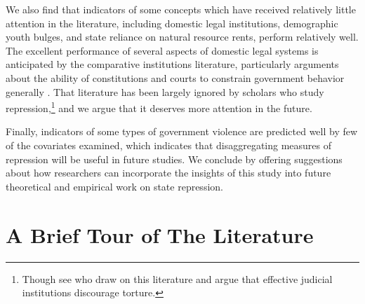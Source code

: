 \documentclass[11pt]{article}
\begin{document}
We also find that indicators of some concepts which have received relatively little attention in the literature, including domestic legal institutions, demographic youth bulges, and state reliance on natural resource rents, perform relatively well. The excellent performance of several aspects of domestic legal systems is anticipated by the comparative institutions literature, particularly arguments about the ability of constitutions and courts to constrain government behavior generally \citep[E.g.,][]{NorthWeingast1989, Ordeshook1992, Weingast1997, Carey2000, Vanberg2005, ElkinsGinsburgMelton2009}. That literature has been largely ignored by scholars who study repression,\footnote{Though see \citet{PowellStaton2009} who draw on this literature and argue that effective judicial institutions discourage torture.} and we argue that it deserves more attention in the future. 

Finally, indicators of some types of government violence are predicted well by few of the covariates examined, which indicates that  disaggregating measures of repression will be useful in future studies. We conclude by offering suggestions about how researchers can incorporate the insights of this study into future theoretical and empirical work on state repression. 

\section*{A Brief Tour of The Literature}
\end{document}
